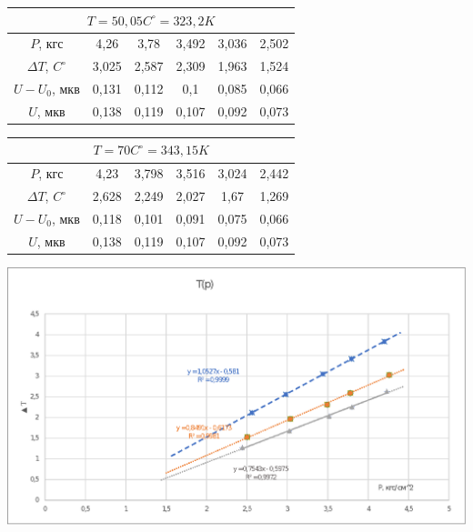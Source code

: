 \documentclass[a4paper,12pt]{article}
\theoremstyle{plain} %
\theoremstyle{definition} %
\theoremstyle{remark} %
\begin{document}
\begin{center}
    		\begin{tabular}{|c|c|c|c|c|c|}
    		\hline 
    		\multicolumn{6}{|c|}{$T=50,05C^\circ = 323,2K$} \\ 
    		\hline 
   		 $P$, кгс & 4,26 & 3,78 & 3,492 & 3,036 & 2,502 \\ 
   		 \hline 
    		$\Delta T$, $C^\circ$ & 3,025  & 2,587 & 2,309 & 1,963 & 1,524 \\ 
    		\hline 
    		$U-U_0$, мкв & 0,131 & 0,112 & 0,1 & 0,085 & 0,066 \\ 
    		\hline 
    		$U$, мкв & 0,138 & 0,119 & 0,107 & 0,092 & 0,073 \\ 
    \hline 
    \end{tabular}
    \end{center}
    \begin{center}
    		\begin{tabular}{|c|c|c|c|c|c|}
    		\hline 
    		\multicolumn{6}{|c|}{$T=70C^\circ = 343,15K$} \\ 
    		\hline 
   		 $P$, кгс & 4,23 & 3,798 & 3,516 & 3,024 & 2,442 \\ 
   		 \hline 
    		$\Delta T$, $C^\circ$ & 2,628  & 2,249 & 2,027 & 1,67 & 1,269 \\ 
    		\hline 
    		$U-U_0$, мкв & 0,118 & 0,101 & 0,091 & 0,075 & 0,066 \\ 
    		\hline 
    		$U$, мкв & 0,138 & 0,119 & 0,107 & 0,092 & 0,073 \\ 
    \hline 
    \end{tabular}
    \end{center}
  
\newpage  
 
{\includegraphics[width=1\linewidth]{Tablitsy.eps}}
\\[5ex]
\end{document}

